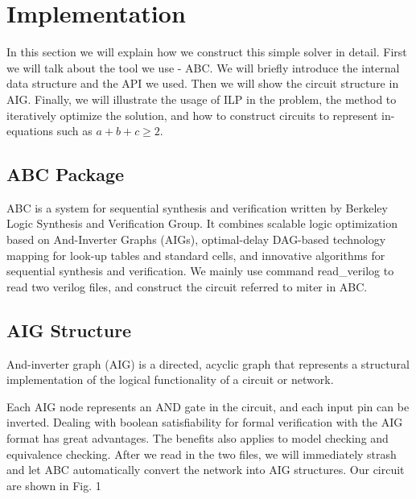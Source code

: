 \section{Implementation}
In this section we will explain how we construct this simple solver in detail. First we will talk about the tool we use - ABC. We will briefly introduce the internal data structure and the API we used. Then we will show the circuit structure in AIG. Finally, we will illustrate the usage of ILP in the problem, the method to iteratively optimize the solution, and how to construct circuits to represent in-equations such as $a+b+c \geq 2$.
\subsection{ABC Package}
ABC is a system for sequential synthesis and verification written by Berkeley Logic Synthesis and Verification Group. It combines scalable logic optimization based on And-Inverter Graphs (AIGs), optimal-delay DAG-based technology mapping for look-up tables and standard cells, and innovative algorithms for sequential synthesis and verification.
We mainly use command read\_verilog to read two verilog files, and construct the circuit referred to miter in ABC.

\subsection{AIG Structure}
And-inverter graph (AIG) is a directed, acyclic graph that represents a structural implementation of the logical functionality of a circuit or network.

Each AIG node represents an AND gate in the circuit, and each input pin can be inverted. Dealing with boolean satisfiability for formal verification with the AIG format has great advantages. The benefits also applies to model checking and equivalence checking.
After we read in the two files, we will immediately strash and let ABC automatically convert the network into AIG structures. Our circuit are shown in Fig. 1
    

